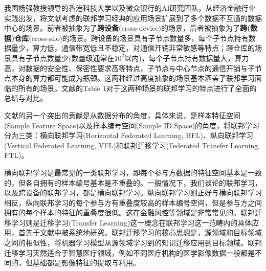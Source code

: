 我国杨强教授领导的香港科技大学以及微众银行的AI研究团队，从经济金融行业实践出发，将文献\parencite{mcmahan2017fed_avg}考虑的联邦学习经典的应用场景扩展到了多个数据不互通的数据中心的场景\cite{Yang_2019_VFL}。前者被抽象为了\textbf{跨设备}(cross-device)的场景，后者被抽象为了\textbf{跨(数据)仓库}(cross-silo)的场景\cite{kairouz2019advances_fl}。跨设备的场景具有子节点数量多，每个子节点持有数据量少，算力低，通信带宽低且不稳定，对通信开销非常敏感等特点；跨仓库的场景具有子节点数量少(数量级通常在$10^2$以内)，每个子节点持有数据量大，算力高，对数据的安全性、保密性要求高等特点，子节点与中心节点的通信开销与子节点本身的算力都可能成为瓶颈。这两种经过高度抽象的场景基本涵盖了联邦学习面临的所有的场景。文献\parencite{kairouz2019advances_fl}的Table 1对于这两种场景的联邦学习的特点进行了全面的总结与对比。

文献\parencite{Yang_2019_VFL}的另一个突出的贡献是从数据分布的角度，具体来说，是样本特征空间(Sample Feature Space)以及样本编号空间(Sample ID Space)的角度，将联邦学习分为三类：横向联邦学习(Horizontal Federated Learning, HFL)、纵向联邦学习(Vertical Federated Learning, VFL)和联邦迁移学习(Federated Transfer Learning, FTL)。

横向联邦学习是最常见的一类联邦学习，即每个参与方数据的特征空间基本是一致的，但各自拥有的样本编号基本是不重叠的。一般情况下，我们谈论的联邦学习，以及跨设备的联邦学习，都是横向联邦学习。纵向联邦学习则正好与横向联邦学习相反，纵向联邦学习的每个参与方有重叠度较高的样本编号空间，但是参与方之间拥有的每个样本的特征的重叠度很低。这在金融风控等领域是非常常见的。联邦迁移学习则是迁移学习(Transfer Learning)这一概念在联邦学习这一范畴内的具体应用，首先于文献\parencite{liu_2020_transfer_fl}中被系统地研究。联邦迁移学习的核心思想是，源领域和目标领域之间的相似性，将机器学习模型从源领域学习到的知识迁移应用到目标领域。联邦迁移学习天然适合于智慧医疗领域，例如不同医疗机构的医学影像数据一般都是不同的，但基础都是影像特征的提取与利用。

